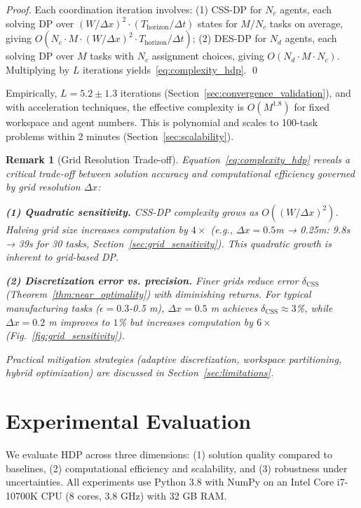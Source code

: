 \documentclass[manuscript,screen,review]{acmart}
\newtheorem{remark}{Remark}
\begin{document}
\begin{proof}
Each coordination iteration involves: (1) CSS-DP for $N_c$ agents, each
solving DP over $(W/\Delta x)^2 \cdot (T_{\text{horizon}}/\Delta t)$ states
for $M/N_c$ tasks on average, giving $O(N_c \cdot M \cdot (W/\Delta x)^2 \cdot T_{\text{horizon}}/\Delta t)$;
(2) DES-DP for $N_d$ agents, each solving DP over $M$ tasks with $N_c$
assignment choices, giving $O(N_d \cdot M \cdot N_c)$. Multiplying by $L$
iterations yields~\eqref{eq:complexity_hdp}. \qed
\end{proof}

Empirically, $L = 5.2 \pm 1.3$ iterations (Section~\ref{sec:convergence_validation}), 
and with acceleration techniques, the effective complexity is $O(M^{1.8})$ 
for fixed workspace and agent numbers. This is polynomial and scales to 
100-task problems within 2 minutes (Section~\ref{sec:scalability}).

\begin{remark}[Grid Resolution Trade-off]
\label{rem:grid_resolution}
Equation~\eqref{eq:complexity_hdp} reveals a critical trade-off between solution 
accuracy and computational efficiency governed by grid resolution $\Delta x$:

\textbf{(1) Quadratic sensitivity.} CSS-DP complexity grows as $O((W/\Delta x)^2)$. 
Halving grid size increases computation by $4\times$ (e.g., $\Delta x = 0.5$m 
→ 0.25m: 9.8s → 39s for 30 tasks, Section~\ref{sec:grid_sensitivity}). This 
quadratic growth is inherent to grid-based DP.

\textbf{(2) Discretization error vs. precision.} Finer grids reduce error 
$\delta_{\text{CSS}}$ (Theorem~\ref{thm:near_optimality}) with diminishing 
returns. For typical manufacturing tasks ($\epsilon = 0.3$-0.5 m), $\Delta x = 0.5$ m 
achieves $\delta_{\text{CSS}} \approx 3$\%, while $\Delta x = 0.2$ m improves 
to $1$\% but increases computation by $6\times$ (Fig.~\ref{fig:grid_sensitivity}).

Practical mitigation strategies (adaptive discretization, workspace partitioning, 
hybrid optimization) are discussed in Section~\ref{sec:limitations}.
\end{remark}

\section{Experimental Evaluation}
\label{sec:Chapter_V}

We evaluate HDP across three dimensions: (1) solution quality compared to 
baselines, (2) computational efficiency and scalability, and (3) robustness 
under uncertainties. All experiments use Python 3.8 with NumPy on an Intel 
Core i7-10700K CPU (8 cores, 3.8 GHz) with 32 GB RAM.
\end{document}
